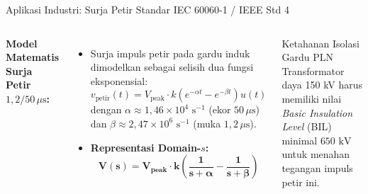\documentclass[aspectratio=169,10pt]{beamer}
\begin{document}
\begin{frame}{Aplikasi Industri: Surja Petir Standar IEC 60060-1 / IEEE Std 4}
  \begin{columns}[c]
    \textbf{Model Matematis Surja Petir $1{,}2/50\,\mu\text{s}$:}
    \begin{itemize}
      \item Surja impuls petir pada gardu induk dimodelkan sebagai selisih dua fungsi eksponensial:
      \begin{equation}
        v_{\text{petir}}(t) = V_{\text{peak}} \cdot k \left( e^{-\alpha t} - e^{-\beta t} \right) u(t)
      \end{equation}
      dengan $\alpha \approx 1{,}46 \times 10^4\text{ s}^{-1}$ (ekor $50\,\mu\text{s}$) dan $\beta \approx 2{,}47 \times 10^6\text{ s}^{-1}$ (muka $1{,}2\,\mu\text{s}$).
      \item \textbf{Representasi Domain-$s$:}
      \begin{equation*}
        \mathbf{V(s) = V_{\text{peak}} \cdot k \left( \frac{1}{s + \alpha} - \frac{1}{s + \beta} \right)}
      \end{equation*}
    \end{itemize}

    \begin{alertblock}{Ketahanan Isolasi Gardu PLN}
      Transformator daya 150 kV harus memiliki nilai \textit{Basic Insulation Level} (BIL) minimal $650\text{ kV}$ untuk menahan tegangan impuls petir ini.
    \end{alertblock}
  \end{columns}
\end{frame}
\end{document}
